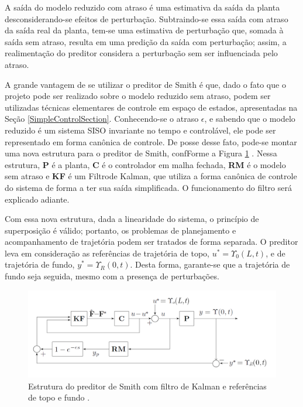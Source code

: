 A saída do modelo reduzido com atraso é uma estimativa da saída da planta desconsiderando-se efeitos de perturbação. Subtraindo-se essa saída com atraso da saída real da planta, tem-se uma estimativa de perturbação que, somada à saída sem atraso, resulta em uma predição da saída com perturbação; assim, a realimentação do preditor considera a perturbação sem ser influenciada pelo atraso.

A grande vantagem de se utilizar o preditor de Smith é que, dado o fato que o projeto pode ser realizado sobre o modelo reduzido sem atraso, podem ser utilizadas técnicas elementares de controle em espaço de estados, apresentadas na Seção \ref{SimpleControlSection}. Conhecendo-se o atraso $\epsilon$, e sabendo que o modelo reduzido é um sistema SISO invariante no tempo e controlável, ele pode ser representado em forma canônica de controle. De posse desse fato, pode-se montar uma nova estrutura para o preditor de Smith, confForme a Figura \ref{smith2} . Nessa estrutura, \textbf{P} é a planta, \textbf{C} é o controlador em malha fechada, \textbf{RM} é o modelo sem atraso e \textbf{KF} é um Filtrode Kalman, que utiliza a forma canônica de controle do sistema de forma a ter sua saída simplificada. O funcionamento do filtro será explicado adiante. 

Com essa nova estrutura, dada a linearidade do sistema, o princípio de superposição é válido; portanto, os problemas de planejamento e acompanhamento de trajetória podem ser tratados de forma separada. O preditor leva em consideração as referências de trajetória de topo, $u^{*} = \Upsilon_0 (L,t)$, e de trajetória de fundo, $y^{*} = \Upsilon_R (0,t)$. Desta forma, garante-se que a trajetória de fundo seja seguida, mesmo com a presença de perturbações.

\begin{figure}[!ht]
\centering
\includegraphics[width=.85\linewidth]{figs/fundamentos/preditorSmith}
\caption{Estrutura do preditor de Smith com filtro de Kalman e referências de topo e fundo \cite{rafaelMestrado}. \label{smith2}}
\end{figure}

